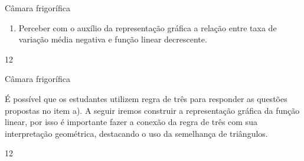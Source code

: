 \cleardoublepage
\begin{objectives}{Câmara frigorífica}
{
\begin{enumerate}
\item Perceber com o auxílio da representação gráfica a relação entre taxa de variação média negativa e função linear decrescente.
\end{enumerate}
}{1}{2}
\end{objectives}
\begin{sugestions}{Câmara frigorífica}
{
É possível que os estudantes utilizem regra de três para responder as questões propostas no item a). A seguir iremos construir a representação gráfica da função linear, por isso é importante fazer a conexão da regra de três com sua interpretação geométrica, destacando o uso da semelhança de triângulos.

\begin{figure}[H]
\centering

\end{figure}
}{1}{2}
\end{sugestions}
